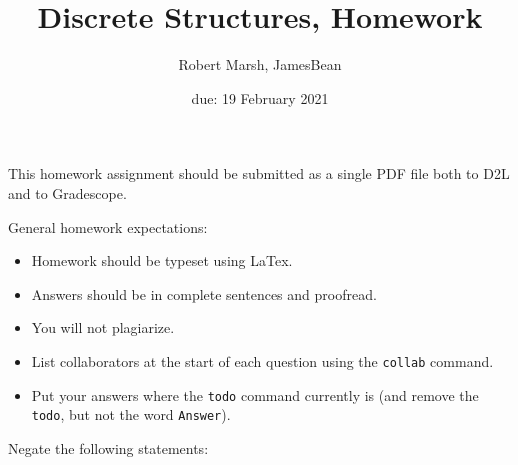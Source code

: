 \documentclass{article}
\title{Discrete Structures, Homework \hwnum}
\author{Robert Marsh, JamesBean}
\date{due: 19 February 2021}
\begin{document}
\maketitle

This homework assignment should be
submitted as a single PDF file both to D2L and to Gradescope.

General homework expectations:
\begin{itemize}
    \item Homework should be typeset using LaTex.
    \item Answers should be in complete sentences and proofread.
    \item You will not plagiarize.  \item List collaborators at the start of each question using the \texttt{collab} command.
    \item Put your answers where the \texttt{todo} command currently is (and
        remove the \texttt{todo}, but not the word \texttt{Answer}).
\end{itemize}

 
Negate the following statements:
\end{document}
